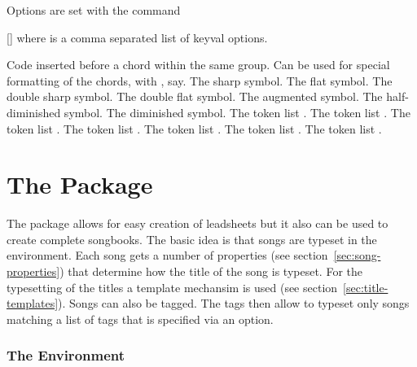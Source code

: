 \documentclass[load-preamble+]{cnltx-doc}
\begin{document}
Options are set with the command
\begin{commands}
  []
    where  is a comma separated list of keyval options.
\end{commands}
\begin{options}
  \Default
    Code inserted before a chord within the same group. Can be used for
    special formatting of the chords, with , say.
    The sharp symbol.
    The flat symbol.
    The double sharp symbol.
    The double flat symbol.
  \Default{+}
    The augmented symbol.
    The half-diminished symbol.
    The diminished symbol.
    The token list .
    The token list .
    The token list .
  \Default
    The token list .
    The token list .
    The token list .
    The token list .
\end{options}

\part{The \leadsheets{} Package}

The \leadsheets{} package allows for easy creation of leadsheets but it also
can be used to create complete songbooks. The basic idea is that songs are
typeset in the  environment.  Each song gets a number of properties
(see section~\ref{sec:song-properties}) that determine how the title of the
song is typeset.  For the typesetting of the titles a template mechansim is
used (see section~\ref{sec:title-templates}).  Songs can also be tagged.  The
tags then allow to typeset only songs matching a list of tags that is
specified via an option.

\section{The  Environment}
\end{document}
